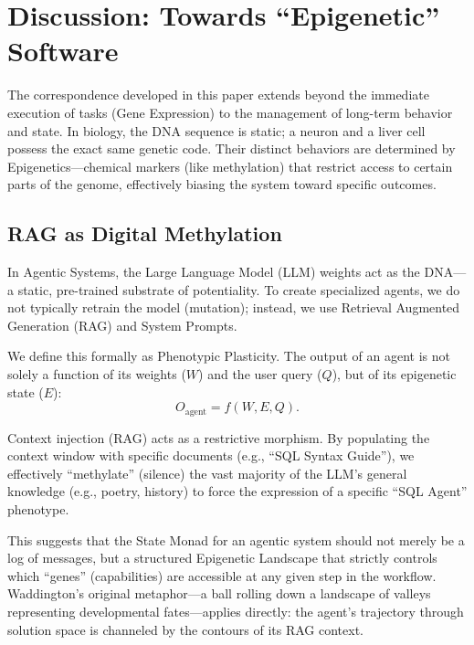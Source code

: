 \section{Discussion: Towards ``Epigenetic'' Software}

The correspondence developed in this paper extends beyond the immediate execution of tasks (Gene Expression) to the
management of long-term behavior and state. In biology, the DNA sequence is static; a neuron and a liver cell
possess the exact same genetic code. Their distinct behaviors are determined by Epigenetics---chemical markers
(like methylation) that restrict access to certain parts of the genome, effectively biasing the system toward
specific outcomes.

\subsection{RAG as Digital Methylation}

In Agentic Systems, the Large Language Model (LLM) weights act as the DNA---a static, pre-trained substrate of
potentiality. To create specialized agents, we do not typically retrain the model (mutation); instead, we use
Retrieval Augmented Generation (RAG) and System Prompts.

We define this formally as Phenotypic Plasticity. The output of an agent is not solely a function of its weights
($W$) and the user query ($Q$), but of its epigenetic state ($E$):
\begin{equation}
O_{\text{agent}} = f(W,E,Q).
\label{eq:phenotypic-plasticity}
\end{equation}

Context injection (RAG) acts as a restrictive morphism. By populating the context window with specific documents
(e.g., ``SQL Syntax Guide''), we effectively ``methylate'' (silence) the vast majority of the LLM's general
knowledge (e.g., poetry, history) to force the expression of a specific ``SQL Agent'' phenotype.

This suggests that the State Monad for an agentic system should not merely be a log of messages, but a structured
Epigenetic Landscape \cite{waddington1957} that strictly controls which ``genes'' (capabilities) are accessible
at any given step in the workflow. Waddington's original metaphor---a ball rolling down a landscape of valleys
representing developmental fates---applies directly: the agent's trajectory through solution space is channeled
by the contours of its RAG context.

